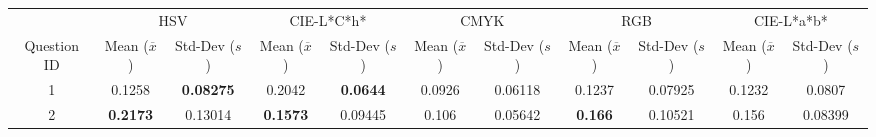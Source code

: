 \begin{table}[htbp]
  \resizebox{\textwidth}{!} {
  \begin{tabular}{@{}ccccccccccc@{}}
    \toprule
                                  & \multicolumn{2}{c}{HSV}                                                                                                                              & \multicolumn{2}{c}{CIE-L*C*h*}                                                                                               & \multicolumn{2}{c}{CMYK}                                                                                                     & \multicolumn{2}{c}{RGB}                                                                                                      & \multicolumn{2}{c}{CIE-L*a*b*}                                                                                               \\ \cmidrule(l){2-11}
    \multirow{-2}{*}{Question ID} & Mean ($\overline{x}$)                                                                  & Std-Dev ($s$)                                             & Mean ($\overline{x}$)                                           & Std-Dev ($s$)                                            & Mean ($\overline{x}$)                                           & Std-Dev ($s$)                                            & Mean ($\overline{x}$)                                           & Std-Dev ($s$)                                            & \multicolumn{1}{c|}{Mean ($\overline{x}$)}                      & \multicolumn{1}{c|}{Std-Dev ($s$)}                       \\ \midrule
    \multicolumn{1}{c|}{1}        & \multicolumn{1}{c|}{0.1258}                                                         & \multicolumn{1}{c||}{\cellcolor[HTML]{32CB00}\textbf{0.08275}}  & \multicolumn{1}{c|}{0.2042}                                  & \multicolumn{1}{c||}{\cellcolor[HTML]{32CB00}\textbf{0.0644}}  & \multicolumn{1}{c|}{0.0926}                                  & \multicolumn{1}{c||}{0.06118}                                  & \multicolumn{1}{c|}{0.1237}                                  & \multicolumn{1}{c||}{0.07925}                                  & \multicolumn{1}{c|}{0.1232}                                  & \multicolumn{1}{c|}{0.0807}                                   \\ \midrule
    \multicolumn{1}{c|}{2}        & \multicolumn{1}{c|}{\cellcolor[HTML]{FD6864}\textbf{0.2173}}                        & \multicolumn{1}{c||}{0.13014}                                   & \multicolumn{1}{c|}{\cellcolor[HTML]{32CB00}\textbf{0.1573}} & \multicolumn{1}{c||}{0.09445}                                  & \multicolumn{1}{c|}{0.106}                                   & \multicolumn{1}{c||}{0.05642}                                  & \multicolumn{1}{c|}{\cellcolor[HTML]{FD6864}\textbf{0.166}}  & \multicolumn{1}{c||}{0.10521}                                  & \multicolumn{1}{c|}{0.156}                                   & \multicolumn{1}{c|}{0.08399}                                  \\ \midrule \midrule

\end{tabular}}
\end{table}
